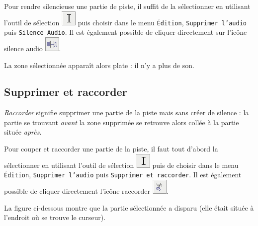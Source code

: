 Pour rendre silencieuse une partie de piste, il suffit de la sélectionner en utilisant l'outil de sélection \includegraphics[width=.5cm]{./images/son01/audacityIconeSelection} puis choisir dans le menu \texttt{Édition}, \texttt{Supprimer l'audio} puis \texttt{Silence Audio}. Il est également possible de cliquer directement sur l'icône silence audio \includegraphics[width=.5cm]{./images/son01/audacityIconeSilence}.


La zone sélectionnée apparaît alors plate : il n'y a plus de son.





\subsection{Supprimer et raccorder}\label{Son1couperRaccorder} 

\emph{Raccorder} signifie supprimer une partie de la piste mais sans créer de silence : la partie se trouvant \emph{avant} la zone supprimée se retrouve alors collée à la partie située \emph{après}.

Pour couper et raccorder une partie de la piste, il faut tout d'abord la sélectionner en utilisant l'outil de sélection \includegraphics[width=.5cm]{./images/son01/audacityIconeSelection} puis de choisir dans le menu \texttt{Édition}, \texttt{Supprimer l'audio} puis \texttt{Supprimer et raccorder}. Il est également possible de cliquer directement l'icône raccorder \includegraphics[width=.5cm]{./images/son01/audacityIconeRaccorder}.


La figure ci-dessous montre que la partie sélectionnée a disparu (elle était située à l'endroit où se trouve le curseur).

